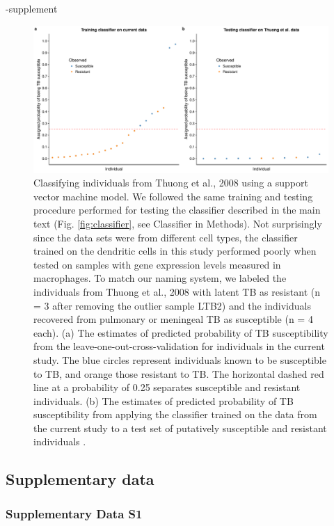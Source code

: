 \documentclass[fleqn,10pt]{wlscirep}
\begin{document}
\begin{filecontents}{\jobname-supplement}
\begin{figure}[ht]
\centering
\includegraphics[width=\linewidth]{../figure/classifier-svm-thuong.pdf}
\caption{
Classifying individuals from Thuong et al., 2008\cite{Thuong2008}
using a support vector machine model. We followed the same training
and testing procedure performed for testing the classifier described
in the main text (Fig. \ref{fig:classifier}, see Classifier in
Methods). Not surprisingly since the data sets were from different
cell types, the classifier trained on the dendritic cells in this
study performed poorly when tested on samples with gene expression
levels measured in macrophages. To match our naming system, we labeled
the individuals from Thuong et al., 2008\cite{Thuong2008} with latent
TB as resistant (n = 3 after removing the outlier sample LTB2) and the
individuals recovered from pulmonary or meningeal TB as susceptible (n
= 4 each). (a) The estimates of predicted probability of TB
susceptibility from the leave-one-out-cross-validation for individuals
in the current study. The blue circles represent individuals known to
be susceptible to TB, and orange those resistant to TB. The horizontal
dashed red line at a probability of 0.25 separates susceptible and
resistant individuals. (b) The estimates of predicted probability of
TB susceptibility from applying the classifier trained on the data
from the current study to a test set of putatively susceptible and
resistant individuals \cite{Thuong2008}.
}
\label{fig:class-svm-thuong}
\end{figure}
\clearpage\newpage
\subsection*{Supplementary data}

\subsubsection*{Supplementary Data S1}


\end{filecontents}
\end{document}
